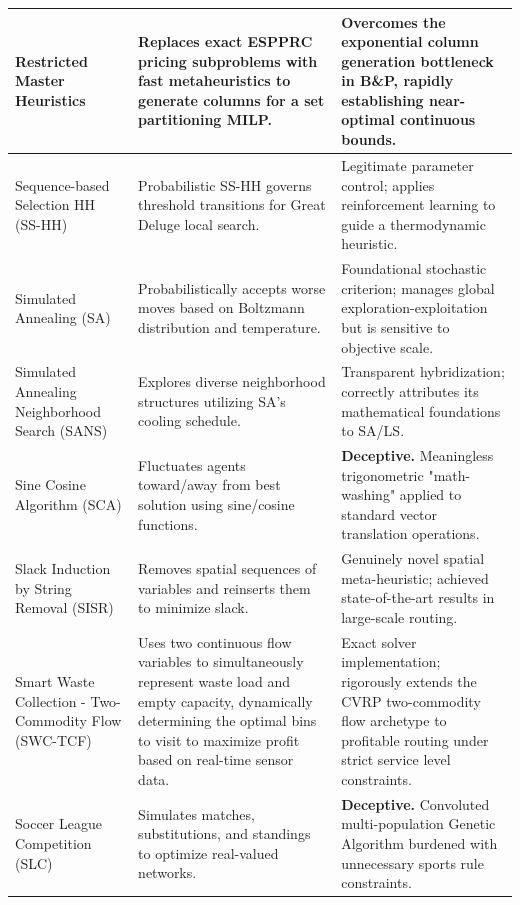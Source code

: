 \documentclass[orivec,runningheads]{llncs}
\begin{document}
\begin{center}
\begin{longtable}
\begin{center}
\begin{longtable}{
  >{\raggedright\arraybackslash}p{}
  >{\raggedright\arraybackslash}p{}
  >{\raggedright\arraybackslash}p{}
}
Restricted Master Heuristics & Replaces exact ESPPRC pricing subproblems with fast metaheuristics to generate columns for a set partitioning MILP. & Overcomes the exponential column generation bottleneck in B\&P, rapidly establishing near-optimal continuous bounds. \\ \midrule

Sequence-based Selection HH (SS-HH) & Probabilistic SS-HH governs threshold transitions for Great Deluge local search. & Legitimate parameter control; applies reinforcement learning to guide a thermodynamic heuristic. \\ \midrule

Simulated Annealing (SA) & Probabilistically accepts worse moves based on Boltzmann distribution and temperature. & Foundational stochastic criterion; manages global exploration-exploitation but is sensitive to objective scale. \\ \midrule

Simulated Annealing Neighborhood Search (SANS) & Explores diverse neighborhood structures utilizing SA's cooling schedule. & Transparent hybridization; correctly attributes its mathematical foundations to SA/LS. \\ \midrule

Sine Cosine Algorithm (SCA) & Fluctuates agents toward/away from best solution using sine/cosine functions. & \textbf{Deceptive.} Meaningless trigonometric "math-washing" applied to standard vector translation operations. \\ \midrule

Slack Induction by String Removal (SISR) & Removes spatial sequences of variables and reinserts them to minimize slack. & Genuinely novel spatial meta-heuristic; achieved state-of-the-art results in large-scale routing. \\ \midrule

Smart Waste Collection - Two-Commodity Flow (SWC-TCF) & Uses two continuous flow variables to simultaneously represent waste load and empty capacity, dynamically determining the optimal bins to visit to maximize profit based on real-time sensor data. & Exact solver implementation; rigorously extends the CVRP two-commodity flow archetype to profitable routing under strict service level constraints. \\ \midrule

Soccer League Competition (SLC) & Simulates matches, substitutions, and standings to optimize real-valued networks. & \textbf{Deceptive.} Convoluted multi-population Genetic Algorithm burdened with unnecessary sports rule constraints. \\ \midrule


\end{longtable}
\end{center}
\end{longtable}
\end{center}
\end{document}
